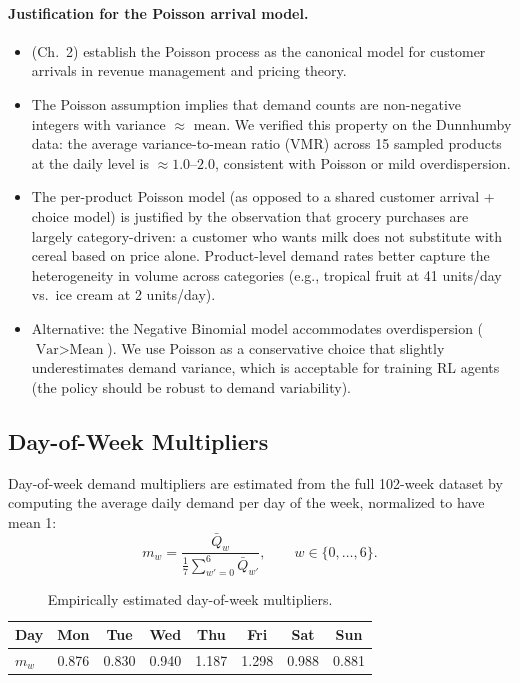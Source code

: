 \documentclass[11pt,a4paper]{article}
\begin{document}
\paragraph{Justification for the Poisson arrival model.}
\begin{itemize}
    \item \citet{talluri2004} (Ch.\ 2) establish the Poisson process as the canonical model for customer arrivals in revenue management and pricing theory.
    \item The Poisson assumption implies that demand counts are non-negative integers with variance $\approx$ mean.
    We verified this property on the Dunnhumby data: the average variance-to-mean ratio (VMR) across 15 sampled products at the daily level is $\approx 1.0$--$2.0$, consistent with Poisson or mild overdispersion.
    \item The per-product Poisson model (as opposed to a shared customer arrival + choice model) is justified by the observation that grocery purchases are largely category-driven: a customer who wants milk does not substitute with cereal based on price alone.
    Product-level demand rates better capture the heterogeneity in volume across categories (e.g., tropical fruit at 41 units/day vs.\ ice cream at 2 units/day).
    \item Alternative: the Negative Binomial model accommodates overdispersion ($\text{Var} > \text{Mean}$).
    We use Poisson as a conservative choice that slightly underestimates demand variance, which is acceptable for training RL agents (the policy should be robust to demand variability).
\end{itemize}

\subsection{Day-of-Week Multipliers}
\label{sec:dow}

Day-of-week demand multipliers are estimated from the full 102-week dataset by computing the average daily demand per day of the week, normalized to have mean 1:
\begin{equation}
m_w = \frac{\bar{Q}_w}{\frac{1}{7}\sum_{w'=0}^{6}\bar{Q}_{w'}}, \qquad w \in \{0, \ldots, 6\}.
\end{equation}

\begin{table}[H]
\centering
\caption{Empirically estimated day-of-week multipliers.}
\begin{tabular}{@{}lccccccc@{}}
\toprule
Day & Mon & Tue & Wed & Thu & Fri & Sat & Sun \\
\midrule
$m_w$ & 0.876 & 0.830 & 0.940 & 1.187 & 1.298 & 0.988 & 0.881 \\
\bottomrule
\end{tabular}
\end{table}
\end{document}

